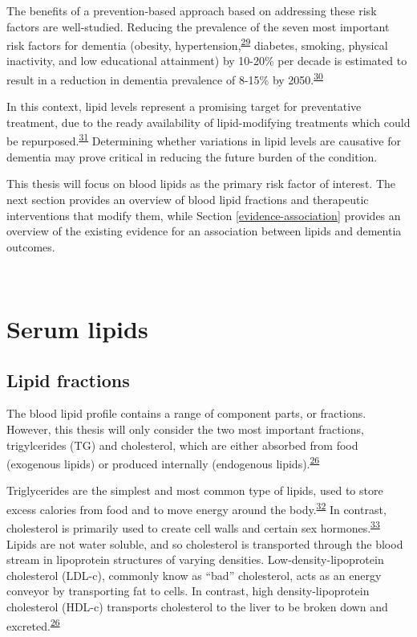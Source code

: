 \documentclass[a4paper, twoside]{templates/ociamthesis}
\begin{document}
The benefits of a prevention-based approach based on addressing these risk factors are well-studied. Reducing the prevalence of the seven most important risk factors for dementia (obesity, hypertension,\textsuperscript{\protect\hyperlink{ref-hughes2020}{29}} diabetes, smoking, physical inactivity, and low educational attainment) by 10-20\% per decade is estimated to result in a reduction in dementia prevalence of 8-15\% by 2050.\textsuperscript{\protect\hyperlink{ref-norton2014potential}{30}}

In this context, lipid levels represent a promising target for preventative treatment, due to the ready availability of lipid-modifying treatments which could be repurposed.\textsuperscript{\protect\hyperlink{ref-pushpakom2019}{31}} Determining whether variations in lipid levels are causative for dementia may prove critical in reducing the future burden of the condition.

This thesis will focus on blood lipids as the primary risk factor of interest. The next section provides an overview of blood lipid fractions and therapeutic interventions that modify them, while Section \ref{evidence-association} provides an overview of the existing evidence for an association between lipids and dementia outcomes.

~

\hypertarget{serum-lipids}{%
\section{Serum lipids}\label{serum-lipids}}

\hypertarget{intro-lipid-fractions}{%
\subsection{Lipid fractions}\label{intro-lipid-fractions}}

The blood lipid profile contains a range of component parts, or fractions. However, this thesis will only consider the two most important fractions, trigylcerides (TG) and cholesterol, which are either absorbed from food (exogenous lipids) or produced internally (endogenous lipids).\textsuperscript{\protect\hyperlink{ref-feingold2000}{26}}

Triglycerides are the simplest and most common type of lipids, used to store excess calories from food and to move energy around the body.\textsuperscript{\protect\hyperlink{ref-laufs2020}{32}} In contrast, cholesterol is primarily used to create cell walls and certain sex hormones.\textsuperscript{\protect\hyperlink{ref-zampelas2019}{33}} Lipids are not water soluble, and so cholesterol is transported through the blood stream in lipoprotein structures of varying densities. Low-density-lipoprotein cholesterol (LDL-c), commonly know as ``bad'' cholesterol, acts as an energy conveyor by transporting fat to cells. In contrast, high density-lipoprotein cholesterol (HDL-c) transports cholesterol to the liver to be broken down and excreted.\textsuperscript{\protect\hyperlink{ref-feingold2000}{26}}
\end{document}
